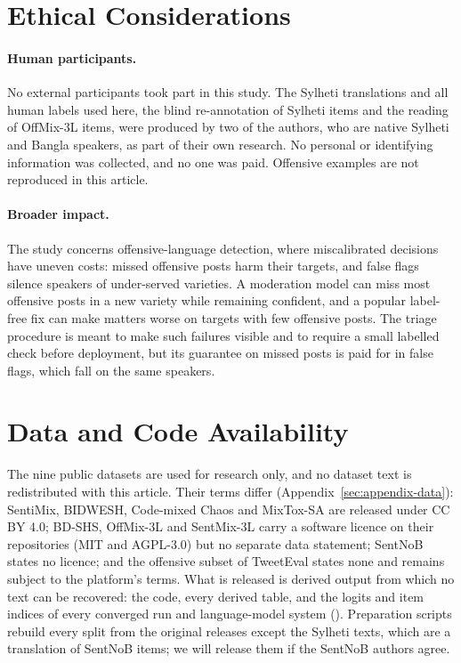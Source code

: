 \section*{Ethical Considerations}
\paragraph{Human participants.}
No external participants took part in this study. The Sylheti translations and all human labels used here, the blind
re-annotation of Sylheti items and the reading of OffMix-3L items, were produced by
two of the authors, who are native Sylheti and Bangla speakers, as part of their own research. No personal or
identifying information was collected, and no one was paid. Offensive examples are not reproduced in this article.

\paragraph{Broader impact.}
The study concerns offensive-language detection, where miscalibrated decisions have uneven costs: missed offensive
posts harm their targets, and false flags silence speakers of under-served varieties. A moderation model can miss most
offensive posts in a new variety while remaining confident, and a popular label-free fix can make matters worse on
targets with few offensive posts. The triage procedure is meant to make such failures visible and to require a small
labelled check before deployment, but its guarantee on missed posts is paid for in false flags, which fall on the same
speakers.

\section*{Data and Code Availability}
The nine public datasets are used for research only, and no dataset text is redistributed with this article. Their
terms differ (Appendix~\ref{sec:appendix-data}): SentiMix, BIDWESH, Code-mixed Chaos and MixTox-SA are released under
CC BY 4.0; BD-SHS, OffMix-3L and SentMix-3L carry a software licence on their repositories (MIT and AGPL-3.0) but no
separate data statement; SentNoB states no licence; and the offensive subset of TweetEval states none and remains
subject to the platform's terms. What is released is derived output from which no text can be recovered: the code,
every derived table, and the logits and item indices of every converged run and language-model system
(\zenodoRecord). Preparation scripts rebuild every split from the original releases except the Sylheti texts, which
are a translation of SentNoB items; we will release them if the SentNoB authors agree.


